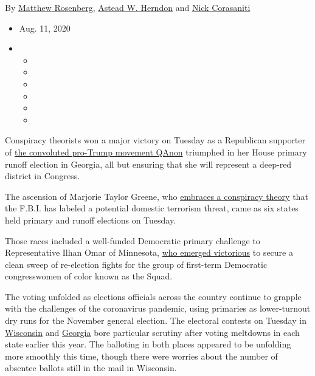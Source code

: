 By
\href{https://www.nytimes3xbfgragh.onion/by/matthew-rosenberg}{Matthew
Rosenberg},
\href{https://www.nytimes3xbfgragh.onion/by/astead-w-herndon}{Astead W.
Herndon} and
\href{https://www.nytimes3xbfgragh.onion/by/nick-corasaniti}{Nick
Corasaniti}

\begin{itemize}
\item
  Aug. 11, 2020
\item
  \begin{itemize}
  \item
  \item
  \item
  \item
  \item
  \item
  \end{itemize}
\end{itemize}

Conspiracy theorists won a major victory on Tuesday as a Republican
supporter of
\href{https://www.nytimes3xbfgragh.onion/2018/08/01/us/politics/what-is-qanon.html}{the
convoluted pro-Trump movement QAnon} triumphed in her House primary
runoff election in Georgia, all but ensuring that she will represent a
deep-red district in Congress.

The ascension of Marjorie Taylor Greene, who
\href{https://www.nytimes3xbfgragh.onion/2020/07/14/us/politics/qanon-politicians-candidates.html}{embraces
a conspiracy theory} that the F.B.I. has labeled a potential domestic
terrorism threat, came as six states held primary and runoff elections
on Tuesday.

Those races included a well-funded Democratic primary challenge to
Representative Ilhan Omar of Minnesota,
\href{https://www.nytimes3xbfgragh.onion/2020/08/11/us/politics/ilhan-omar-minnesota-primary-election.html}{who
emerged victorious} to secure a clean sweep of re-election fights for
the group of first-term Democratic congresswomen of color known as the
Squad.

The voting unfolded as elections officials across the country continue
to grapple with the challenges of the coronavirus pandemic, using
primaries as lower-turnout dry runs for the November general election.
The electoral contests on Tuesday in
\href{https://www.nytimes3xbfgragh.onion/2020/04/09/us/politics/wisconsin-election-absentee-coronavirus.html}{Wisconsin}
and
\href{https://www.nytimes3xbfgragh.onion/2020/07/25/us/politics/georgia-election-voting-problems.html}{Georgia}
bore particular scrutiny after voting meltdowns in each state earlier
this year. The balloting in both places appeared to be unfolding more
smoothly this time, though there were worries about the number of
absentee ballots still in the mail in Wisconsin.

